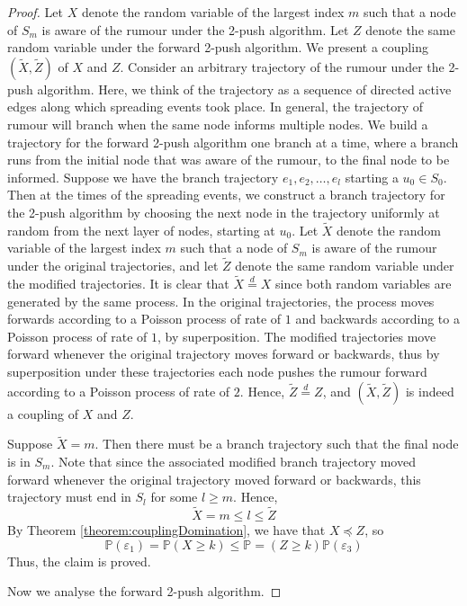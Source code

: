 \begin{proof}
	\noindent
	Let $X$ denote the random variable of the largest index $m$ such that a node of $S_m$ is aware of the rumour under the 2-push algorithm. Let $Z$ denote the same random variable under the forward 2-push algorithm. We present a coupling $(\tilde{X}, \tilde{Z})$ of $X$ and $Z$. 
	Consider an arbitrary trajectory of the rumour under the 2-push algorithm. Here, we think of the trajectory as a sequence of directed active edges along which spreading events took place. In general, the trajectory of rumour will branch when the same node informs multiple nodes. We build a trajectory for the forward 2-push algorithm one branch at a time, where a branch runs from the initial node that was aware of the rumour, to the final node to be informed. Suppose we have the branch trajectory $e_1, e_2, \dots, e_l$ starting a $u_0 \in S_0$. Then at the times of the spreading events, we construct a branch trajectory for the 2-push algorithm by choosing the next node in the trajectory uniformly at random from the next layer of nodes, starting at $u_0$. Let $\tilde{X}$ denote the random variable of the largest index $m$ such that a node of $S_m$ is aware of the rumour under the original trajectories, and let $\tilde{Z}$ denote the same random variable under the modified trajectories. It is clear that $\tilde{X} \stackrel {d}{=} X$ since both random variables are generated by the same process. In the original trajectories, the process moves forwards according to a Poisson process of rate of $1$ and backwards according to a Poisson process of rate of $1$, by superposition. The modified trajectories move forward whenever the original trajectory moves forward or backwards, thus by superposition under these trajectories each node pushes the rumour forward according to a Poisson process of rate of $2$. Hence, $\tilde{Z} \stackrel{d}{=} Z$, and $(\tilde{X}, \tilde{Z})$ is indeed a coupling of $X$ and $Z$. 
	
	Suppose $\tilde{X} = m$. Then there must be a branch trajectory such that the final node is in $S_m$. Note that since the associated modified branch trajectory moved forward whenever the original trajectory moved forward or backwards, this trajectory must end in $S_l$ for some $l \geq m$. Hence, 
	$$
		\tilde{X} = m \leq l \leq \tilde{Z}
	$$
	By Theorem \ref{theorem:couplingDomination}, we have that $X \preceq Z$, so
	$$
		\mathbb{P}(\varepsilon_1) 
		= \mathbb{P}(X \geq k) 
		\leq \mathbb{P}=(Z \geq k) \mathbb{P}(\varepsilon_3)
	$$
	Thus, the claim is proved.

	Now we analyse the forward 2-push algorithm.


\end{proof}

